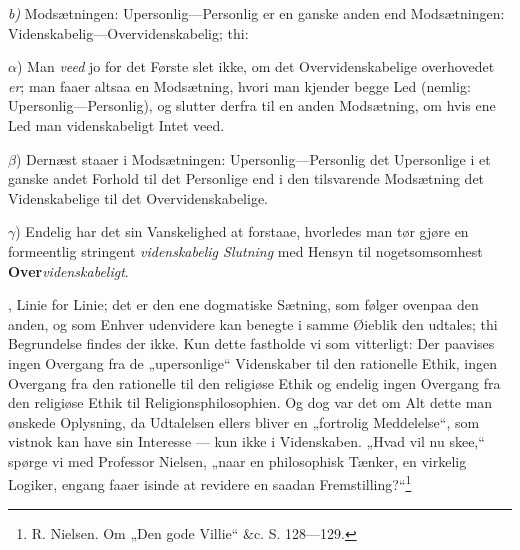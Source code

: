 \documentclass[12pt,a4paper]{book}
\newcommand{\opage}[1]{\marginnote{\footnotesize\textit{[#1]}}}
\begin{document}
{%
\par \textit{b)} Modsætningen: Upersonlig---Personlig er en ganske anden
end Modsætningen: Videnskabelig---Overvidenskabelig;
thi:
\par $\alpha$) Man \emph{veed} jo for det Første slet ikke, om det Overvidenskabelige
overhovedet \emph{er}; man faaer altsaa en
Modsætning, hvori man kjender begge Led (nemlig:
Upersonlig---Personlig), og slutter derfra til en anden
Modsætning, om hvis ene Led man videnskabeligt
Intet veed.
\par $\beta$) Dernæst staaer i Modsætningen: Upersonlig---Personlig
det Upersonlige i et ganske andet Forhold til
det Personlige end i den tilsvarende Modsætning
det Videnskabelige til det Overvidenskabelige.
\par $\gamma$) Endelig har det sin Vanskelighed at forstaae, hvorledes
man tør gjøre en formeentlig stringent \emph{videnskabelig
Slutning} med Hensyn til nogetsomsomhest
\textbf{Over}\emph{videnskabeligt}.}, Linie for Linie; det er
den ene dogmatiske Sætning, som følger ovenpaa den
\opage{33}\setcounter{footnote}{0}%
anden, og som Enhver udenvidere kan benegte i samme
Øieblik den udtales; thi Begrundelse findes der ikke.
\opage{34}\setcounter{footnote}{0}%
Kun dette fastholde vi som vitterligt: Der paavises ingen
Overgang fra de „upersonlige“ Videnskaber til den rationelle
Ethik, ingen Overgang fra den rationelle til den
religiøse Ethik og endelig ingen Overgang fra den religiøse
Ethik til Religionsphilosophien. Og dog var det
om Alt dette man ønskede Oplysning, da Udtalelsen
ellers bliver en „fortrolig Meddelelse“, som vistnok kan
have sin Interesse --- kun ikke i Videnskaben. „Hvad vil
nu skee,“ spørge vi med Professor Nielsen, „naar en
philosophisk Tænker, en virkelig Logiker, engang faaer
isinde at revidere en saadan Fremstilling?“\footnote{R. Nielsen. Om „Den gode Villie“ \&c. S. 128---129.}
\end{document}
